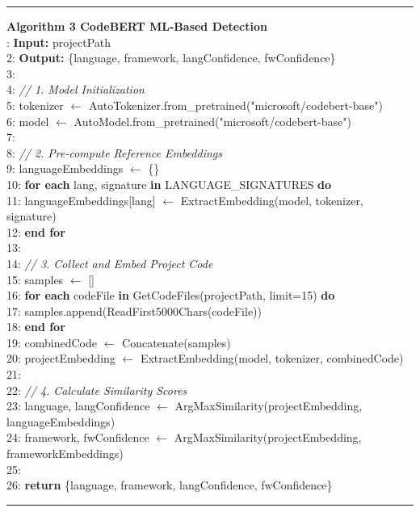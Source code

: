 \noindent\rule{\textwidth}{0.4pt}
\textbf{Algorithm 3 CodeBERT ML-Based Detection}\\
: \textbf{Input:} projectPath\\
2: \textbf{Output:} \{language, framework, langConfidence, fwConfidence\}\\
3:\\
4: \textit{// 1. Model Initialization}\\
5: tokenizer $\leftarrow$ AutoTokenizer.from\_pretrained("microsoft/codebert-base")\\
6: model $\leftarrow$ AutoModel.from\_pretrained("microsoft/codebert-base")\\
7:\\
8: \textit{// 2. Pre-compute Reference Embeddings}\\
9: languageEmbeddings $\leftarrow$ \{\}\\
10: \textbf{for each} lang, signature \textbf{in} LANGUAGE\_SIGNATURES \textbf{do}\\
11: \hspace{0.5cm}languageEmbeddings[lang] $\leftarrow$ ExtractEmbedding(model, tokenizer, signature)\\
12: \textbf{end for}\\
13:\\
14: \textit{// 3. Collect and Embed Project Code}\\
15: samples $\leftarrow$ []\\
16: \textbf{for each} codeFile \textbf{in} GetCodeFiles(projectPath, limit=15) \textbf{do}\\
17: \hspace{0.5cm}samples.append(ReadFirst5000Chars(codeFile))\\
18: \textbf{end for}\\
19: combinedCode $\leftarrow$ Concatenate(samples)\\
20: projectEmbedding $\leftarrow$ ExtractEmbedding(model, tokenizer, combinedCode)\\
21:\\
22: \textit{// 4. Calculate Similarity Scores}\\
23: language, langConfidence $\leftarrow$ ArgMaxSimilarity(projectEmbedding, languageEmbeddings)\\
24: framework, fwConfidence $\leftarrow$ ArgMaxSimilarity(projectEmbedding, frameworkEmbeddings)\\
25:\\
26: \textbf{return} \{language, framework, langConfidence, fwConfidence\}\\
\noindent\rule{\textwidth}{0.4pt}

